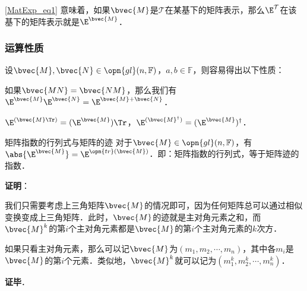 \autoref{MatExp_eq1} 意味着，如果$\bvec{M}$是$\mathcal{T}$在某基下的矩阵表示，那么$\E^\mathcal{T}$在该基下的矩阵表示就是$\E^\bvec{M}$．

\subsubsection{运算性质}

设$\bvec{M}, \bvec{N}\in \opn{gl}(n, \mathbb{F})$，$a, b\in\mathbb{F}$，则容易得出以下性质：

如果$\bvec{MN}=\bvec{NM}$，那么我们有$\E^{\bvec{M}}\E^{\bvec{N}}=\E^{\bvec{M}+\bvec{N}}$．

$\E^{(\bvec{M}\Tr)}=({\E^\bvec{M}})\Tr$，$\E^{(\bvec{M}^\dagger)}=({\E^\bvec{M}})^\dagger$．

\begin{theorem}{矩阵指数的行列式与矩阵的迹}
对于$\bvec{M}\in\opn{gl}(n, \mathbb{F})$，有$\abs{\E^\bvec{M}}=\E^{\opn{tr}(\bvec{M})}$．即：矩阵指数的行列式，等于矩阵迹的指数．
\end{theorem}

\textbf{证明}：

我们只需要考虑上三角矩阵$\bvec{M}$的情况即可，因为任何矩阵总可以通过相似变换变成上三角矩阵．此时，$\bvec{M}$的迹就是主对角元素之和，而$\bvec{M}^k$的第$i$个主对角元素都是$\bvec{M}$的第$i$个主对角元素的$k$次方．

如果只看主对角元素，那么可以记$\bvec{M}$为$(m_1, m_2,\cdots,m_n)$，其中各$m_i$是$\bvec{M}$的第$i$个元素．类似地，$\bvec{M}^k$就可以记为$(m_1^k, m_2^k,\cdots,m_n^k)$．

\textbf{证毕}．








